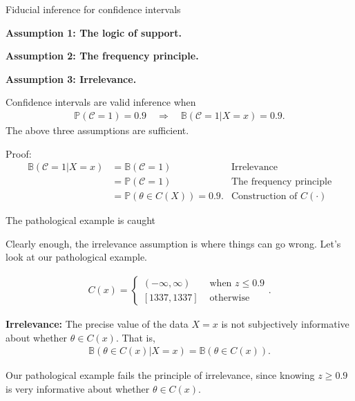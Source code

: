 \documentclass[8pt]{beamer}\usepackage[]{graphicx}\usepackage[]{color}
\def\p#1{\mathbb{P}\left(#1\right)}
\def\b#1{\mathbb{B}\left(#1\right)}
\def\cover{\mathscr{C}}
\begin{document}
\begin{frame}{Fiducial inference for confidence intervals}

\textbf{Assumption 1: The logic of support.}

\textbf{Assumption 2: The frequency principle.}

\textbf{Assumption 3: Irrelevance.}

Confidence intervals are valid inference when
%
\begin{align*}
\p{\cover = 1} = 0.9 \quad \Rightarrow \quad
\b{\cover = 1 | X = x} = 0.9.
\end{align*}
%
The above three assumptions are sufficient.

\pause

Proof:
%
\begin{align*}
%
\b{\cover = 1 | X = x} &= \b{\cover = 1}
    & \textrm{Irrelevance}\\
&= \p{\cover = 1}
    & \textrm{The frequency principle}\\
&= \p{\theta \in C(X)} = 0.9.
& \textrm{Construction of }C(\cdot)
%
\end{align*}
%
\end{frame}




\begin{frame}{The pathological example is caught}

Clearly enough, the irrelevance assumption is where things can go wrong.
Let's look at our pathological example.

\begin{align*}
%
C(x) =
\begin{cases}
    (-\infty, \infty) & \textrm{ when } z \le 0.9 \\
    [1337, 1337] & \textrm{ otherwise }
\end{cases}.
%
\end{align*}
%

\textbf{Irrelevance:} The precise value of the data $X=x$ is not  subjectively
informative about whether $\theta \in C(x)$.  That is,
%
\begin{align*}
%
\b{\theta \in C(x) | X = x} = \b{\theta \in C(x)}.
%
\end{align*}
%


Our pathological example fails the principle of irrelevance, since
knowing $z \ge 0.9$ is very informative about whether $\theta \in C(x)$.

\end{frame}
\end{document}
